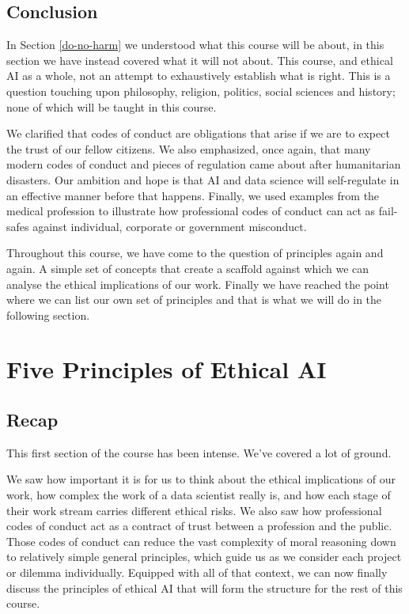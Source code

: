 \documentclass[
]{book}
\theoremstyle{definition}
\theoremstyle{definition}
\theoremstyle{definition}
\theoremstyle{definition}
\theoremstyle{remark}
\begin{document}
\hypertarget{conclusion-2}{%
\subsection{Conclusion}\label{conclusion-2}}

In Section \ref{do-no-harm} we understood what this course will be about, in this section we have instead covered what it will not about. This course, and ethical AI as a whole, not an attempt to exhaustively establish what is right. This is a question touching upon philosophy, religion, politics, social sciences and history; none of which will be taught in this course.

We clarified that codes of conduct are obligations that arise if we are to expect the trust of our fellow citizens. We also emphasized, once again, that many modern codes of conduct and pieces of regulation came about after humanitarian disasters. Our ambition and hope is that AI and data science will self-regulate in an effective manner before that happens. Finally, we used examples from the medical profession to illustrate how professional codes of conduct can act as fail-safes against individual, corporate or government misconduct.

Throughout this course, we have come to the question of principles again and again. A simple set of concepts that create a scaffold against which we can analyse the ethical implications of our work. Finally we have reached the point where we can list our own set of principles and that is what we will do in the following section.

\hypertarget{five-principles-of-ethical-ai}{%
\section{Five Principles of Ethical AI}\label{five-principles-of-ethical-ai}}

\hypertarget{recap}{%
\subsection{Recap}\label{recap}}

This first section of the course has been intense. We've covered a lot of ground.

We saw how important it is for us to think about the ethical implications of our work, how complex the work of a data scientist really is, and how each stage of their work stream carries different ethical risks. We also saw how professional codes of conduct act as a contract of trust between a profession and the public. Those codes of conduct can reduce the vast complexity of moral reasoning down to relatively simple general principles, which guide us as we consider each project or dilemma individually. Equipped with all of that context, we can now finally discuss the principles of ethical AI that will form the structure for the rest of this course.
\end{document}
